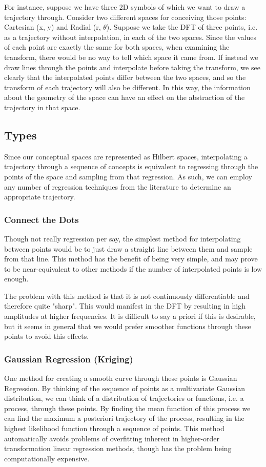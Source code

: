 For instance, suppose we have three 2D symbols of which we want to draw a trajectory through. Consider two different spaces for conceiving those points: Cartesian (x, y) and Radial (r, $\theta$). Suppose we take the DFT of three points, i.e. as a trajectory without interpolation, in each of the two spaces.  Since the values of each point are exactly the same for both spaces, when examining the transform, there would be no way to tell which space it came from.  If instead we draw lines through the points and interpolate before taking the transform, we see clearly that the interpolated points differ between the two spaces, and so the transform of each trajectory will also be different.  In this way, the information about the geometry of the space can have an effect on the abstraction of the trajectory in that space.

\subsection{Types}
Since our conceptual spaces are represented as Hilbert spaces, interpolating a trajectory through a sequence of concepts is equivalent to regressing through the points of the space and sampling from that regression.  As such, we can employ any number of regression techniques from the literature to determine an appropriate trajectory.

\subsubsection{Connect the Dots}
Though not really regression per say, the simplest method for interpolating between points would be to just draw a straight line between them and sample from that line.  This method has the benefit of being very simple, and may prove to be near-equivalent to other methods if the number of interpolated points is low enough.

The problem with this method is that it is not continuously differentiable and therefore quite "sharp".  This would manifest in the DFT by resulting in high amplitudes at higher frequencies.  It is difficult to say a priori if this is desirable, but it seems in general that we would prefer smoother functions through these points to avoid this effects.

\subsubsection{Gaussian Regression (Kriging)}
One method for creating a smooth curve through these points is Gaussian Regression.  By thinking of the sequence of points as a multivariate Gaussian distribution, we can think of a distribution of trajectories or functions, i.e. a process, through these points.  By finding the mean function of this process we can find the maximum a posteriori trajectory of the process, resulting in the highest likelihood function through a sequence of points.  This method automatically avoids problems of overfitting inherent in higher-order transformation linear regression methods, though has the problem being computationally expensive.

